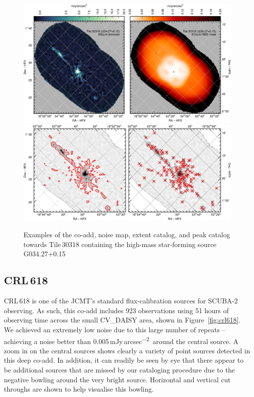\documentclass[twocolumn,times]{aastex6}
\newcommand{\jyas}{Jy\,arcsec\textsuperscript{$-$2}}
\begin{document}
\begin{figure}
  \centering
  \includegraphics{tile30318-g34-coadd-noise.pdf}
  \\[3mm]
  \includegraphics{tile30318-g34-extent-peak.pdf}
  \caption{Examples of the co-add, noise map, extent catalog, and peak
    catalog towards Tile\,30318 containing the high-mass star-forming
    source G034.27+0.15}
  \label{fig:g34-3}
\end{figure}
\subsection{CRL\,618}
CRL\,618 is one of the JCMT's standard flux-calibration sources for
SCUBA-2 observing. As such, this co-add includes 923 observations using
51 hours of observing time across the small CV\_DAISY area, shown in
Figure~\ref{fig:crl618}. We achieved an extremely low noise due to
this large number of repeats -- achieving a noise better than
0.005\,m\jyas\ around the central source. A zoom in on the central
sources shows clearly a variety of point sources detected in this deep
co-add. In addition, it can readily be seen by eye that there appear to
be additional sources that are missed by our cataloging procedure due
to the negative bowling around the very bright source. Horizontal and
vertical cut throughs are shown to help visualise this bowling.
\end{document}
